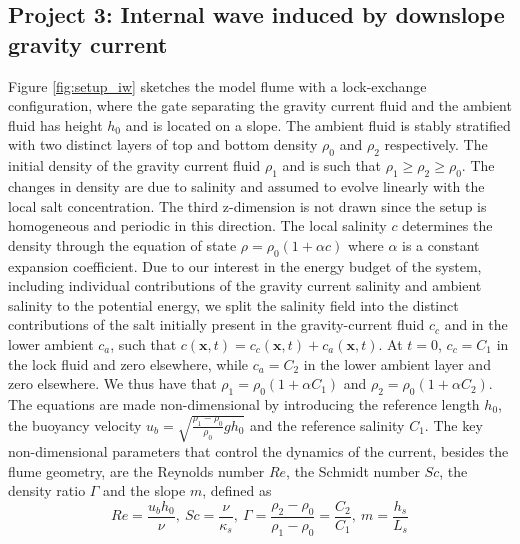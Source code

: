 \documentclass[10pt]{article}
\newcommand{\beq}{\begin{equation}}
\newcommand{\eeq}{ \end{equation} }
\newcommand{\mbf}{\mathbf}
\begin{document}
\subsection*{Project 3: Internal wave induced by downslope gravity current}\label{sec:internal_wave}
Figure \ref{fig:setup_iw} sketches the model flume with a lock-exchange configuration, where the gate separating the gravity current fluid and the ambient fluid has height $h_0$ and is located on a slope. The ambient fluid is stably stratified with two distinct layers of top and bottom density $\rho_0$ and $\rho_2$ respectively. The initial density of the gravity current fluid $\rho_1$ and is such that $\rho_1\geq \rho_2\geq \rho_0$. The changes in density are due to salinity and assumed to evolve linearly with the local salt concentration. The third z-dimension is not drawn since the setup is homogeneous and periodic in this direction. The local salinity $c$ determines the density through the equation of state $\rho=\rho_0(1+\alpha c)$ where $\alpha$ is a constant expansion coefficient. Due to our interest in the energy budget of the system, including individual contributions of the gravity current salinity and ambient salinity to the potential energy, we split the salinity field into the distinct contributions of the salt initially present in the gravity-current fluid $c_c$ and in the lower ambient $c_a$, such that $c(\mbf x,t)=c_c(\mbf x,t)+c_a(\mbf x,t)$. At $t=0$, $c_c=C_1$ in the lock fluid and zero elsewhere, while $c_a=C_2$ in the lower ambient layer and zero elsewhere. We thus have that $\rho_1 = \rho_0(1+\alpha C_1)$ and $\rho_2 = \rho_0(1+\alpha C_2)$. The equations are made non-dimensional by introducing the reference length $h_0$, the buoyancy velocity  $u_b=\sqrt{\frac{\rho_1-\rho_0}{\rho_0}gh_0}$ and the reference salinity $C_1$. The key non-dimensional parameters that control the dynamics of the current, besides the flume geometry, are the Reynolds number $Re$, the Schmidt number $Sc$, the density ratio $\Gamma$ and the slope $m$, defined as
\beq
Re=\frac{u_bh_0}{\nu}, \ Sc = \frac{\nu}{\kappa_s},\ \Gamma=\frac{\rho_2-\rho_0}{\rho_1-\rho_0}=\frac{C_2}{C_1},\ m=\frac{h_s}{L_s}
\eeq
\end{document}
